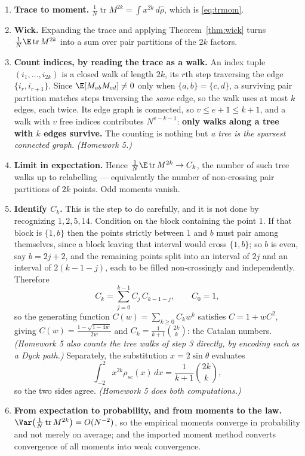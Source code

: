 \documentclass[11pt]{article}
\providecommand{\Tr}{\operatorname{tr}}
\begin{document}
\begin{enumerate}[label=\textbf{\arabic*.},leftmargin=2.1em,itemsep=0.25em]
\item \textbf{Trace to moment.} $\frac1N\Tr M^{2k}=\int x^{2k}\,d\hat\rho$, which is \eqref{eq:trmom}.
\item \textbf{Wick.} Expanding the trace and applying Theorem~\ref{thm:wick} turns $\frac1N\E\Tr M^{2k}$ into a sum over pair partitions of the $2k$ factors.
\item \textbf{Count indices, by reading the trace as a walk.} An index tuple $(i_1,\dots,i_{2k})$ is a closed walk of length $2k$, its $r$th step traversing the edge $\{i_r,i_{r+1}\}$. Since $\E[M_{ab}M_{cd}]\ne0$ only when $\{a,b\}=\{c,d\}$, a surviving pair partition matches steps traversing the \emph{same} edge, so the walk uses at most $k$ edges, each twice. Its edge graph is connected, so $v\le e+1\le k+1$, and a walk with $v$ free indices contributes $N^{v-k-1}$: \textbf{only walks along a tree with $k$ edges survive.} The counting is nothing but \emph{a tree is the sparsest connected graph}. \emph{(Homework 5.)}
\item \textbf{Limit in expectation.} Hence $\frac1N\E\Tr M^{2k}\to C_k$, the number of such tree walks up to relabelling --- equivalently the number of non-crossing pair partitions of $2k$ points. Odd moments vanish.
\item \textbf{Identify $C_k$.} This is the step to do carefully, and it is not done by recognizing $1,2,5,14$. Condition on the block containing the point $1$. If that block is $\{1,b\}$ then the points strictly between $1$ and $b$ must pair among themselves, since a block leaving that interval would cross $\{1,b\}$; so $b$ is even, say $b=2j+2$, and the remaining points split into an interval of $2j$ and an interval of $2(k-1-j)$, each to be filled non-crossingly and independently. Therefore
\[
C_k=\sum_{j=0}^{k-1}C_j\,C_{k-1-j},\qquad C_0=1,
\]
so the generating function $C(w)=\sum_{k\ge0}C_kw^k$ satisfies $C=1+wC^2$, giving $C(w)=\frac{1-\sqrt{1-4w}}{2w}$ and $C_k=\frac{1}{k+1}\binom{2k}{k}$: the Catalan numbers. \emph{(Homework 5 also counts the tree walks of step 3 directly, by encoding each as a Dyck path.)} Separately, the substitution $x=2\sin\theta$ evaluates
\[
\int_{-2}^{2}x^{2k}\rho_{sc}(x)\,dx=\frac{1}{k+1}\binom{2k}{k},
\]
so the two sides agree. \emph{(Homework 5 does both computations.)}
\item \textbf{From expectation to probability, and from moments to the law.} $\Var\big(\frac1N\Tr M^{2k}\big)=O(N^{-2})$, so the empirical moments converge in probability and not merely on average; and the imported moment method converts convergence of all moments into weak convergence.
\end{enumerate}
\end{document}

